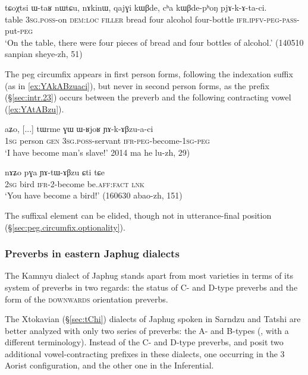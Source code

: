\begin{exe}
\ex \label{ex:pjAkAtaci.passive}
 \gll   tɕoχtsi ɯ-taʁ nɯtɕu, nɤkinɯ, qajɣi kɯβde, cʰa kɯβde-pʰoŋ pjɤ-k-ɤ-ta-ci. \\
table \textsc{3sg}.\textsc{poss}-on \textsc{dem}:\textsc{loc} \textsc{filler} bread four alcohol four-bottle \textsc{ifr}.\textsc{ipfv}-\textsc{peg}-\textsc{pass}-put-\textsc{peg} \\
\glt `On the table, there were four pieces of bread and four bottles of alcohol.' (140510 sanpian sheye-zh, 51)
\end{exe}

The peg circumfix appears in first person forms, following the indexation suffix (as in \ref{ex:YAkABzuaci}), but never in second person forms, as the  prefix (§\ref{sec:intr.23}) occurs between the preverb and the following contracting vowel (\ref{ex:YAtABzu}).

\begin{exe}
\ex \label{ex:YAkABzuaci}
 \gll aʑo, [...] tɯrme ɣɯ ɯ-ʁjoʁ ɲɤ-k-ɤβzu-a-ci \\
 \textsc{1sg} { } person \textsc{gen} \textsc{3sg}.\textsc{poss}-servant \textsc{ifr}-\textsc{peg}-become-\textsc{1sg}-\textsc{peg} \\
 \glt `I have become man's slave!' 2014 ma he lu-zh, 29)
\end{exe}

\begin{exe}
\ex \label{ex:YAtABzu}
 \gll nɤʑo pɣa ɲɤ-tɯ-ɤβzu ɕti tɕe \\
 \textsc{2sg} bird \textsc{ifr}-2-become be.\textsc{aff}:\textsc{fact} \textsc{lnk} \\
 \glt `You have become a bird!' (160630 abao-zh, 151)
 \end{exe}
 
 
The  suffixal element can be elided, though not in utterance-final position (§\ref{sec:peg.circumfix.optionality}).

 
\subsubsection{Preverbs in eastern Japhug dialects} \label{sec:xtokavian.preverbs}
The Kamnyu dialect of Japhug stands apart from most varieties in terms of its system of preverbs in two regards: the status of C- and D-type preverbs and the form of the \textsc{downwards} orientation preverbs.

The Xtokavian (§\ref{sec:tChi}) dialects of Japhug spoken in Sarndzu and Tatshi are better analyzed with only two series of preverbs: the A- and B-types (\citealt[70]{lin11direction}, with a different terminology). Instead of the C- and D-type preverbs, \citet{linluo03} and \citet{lin11direction} posit two additional vowel-contracting   prefixes in these dialects, one occurring in the 3\flobv{} Aorist configuration, and the other one in the Inferential.

